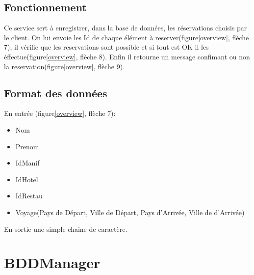 		\subsection{Fonctionnement}
	
			Ce service sert à enregistrer, dans la base de données, les réservations
			choisis par le client. On lui envoie les Id de chaque élément à
			reserver(figure\ref{overview}, flèche 7), il vérifie que les reservations
			sont possible et si tout est OK il les éffectue(figure\ref{overview}, flèche
			8). Enfin il retourne un message confimant ou non la
			reservation(figure\ref{overview}, flèche 9).
	
		\subsection{Format des données}
		
			En entrée (figure\ref{overview}, flèche 7):
			\begin{itemize}
			  \item Nom
			  \item Prenom
			  \item IdManif
			  \item IdHotel
			  \item IdRestau
			  \item Voyage(Pays de Départ, Ville de Départ, Pays d'Arrivée, Ville de
			  d'Arrivée)\\
			\end{itemize}
	
			En sortie une simple chaine de caractère.
	
	\section{BDDManager}
		
		
\clearpage
